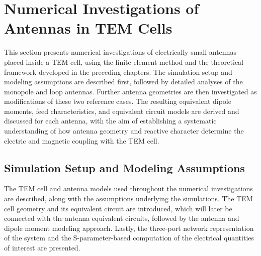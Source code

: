 
\section{Numerical Investigations of Antennas in TEM Cells}\label{sec:num-inv}

This section presents numerical investigations of electrically small antennas 
placed inside a TEM cell, using the finite element method and the theoretical 
framework developed in the preceding chapters. The simulation setup and modeling 
assumptions are described first, followed by detailed analyses of the monopole 
and loop antennas. Further antenna geometries are then investigated as 
modifications of these two reference cases. The resulting equivalent dipole moments, 
feed characteristics, and equivalent circuit models are derived and discussed for 
each antenna, with the aim of establishing a systematic understanding of how 
antenna geometry and reactive character determine the electric and magnetic 
coupling with the TEM cell.

\subsection{Simulation Setup and Modeling Assumptions}

The TEM cell and antenna models used throughout the numerical investigations 
are described, along with the assumptions underlying the simulations. 
The TEM cell geometry and its equivalent circuit are introduced, which will 
later be connected with the antenna equivalent circuits, followed by the 
antenna and dipole moment modeling approach. Lastly, the three-port network 
representation of the system and the S-parameter-based computation of the 
electrical quantities of interest are presented.



